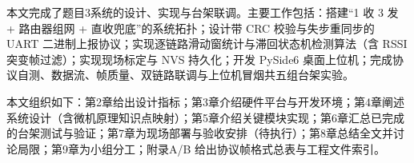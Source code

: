 本文完成了题目3系统的设计、实现与台架联调。主要工作包括：搭建“1 收 3 发 + 路由器组网 + 直收兜底”的系统拓扑；设计带 CRC 校验与失步重同步的 UART 二进制上报协议；实现逐链路滑动窗统计与滞回状态机检测算法（含 RSSI 突变帧过滤）；实现现场标定与 NVS 持久化；开发 PySide6 桌面上位机；完成协议自测、数据流、帧质量、双链路联调与上位机冒烟共五组台架实验。

本文组织如下：第2章给出设计指标；第3章介绍硬件平台与开发环境；第4章阐述系统设计（含微机原理知识点映射）；第5章介绍关键模块实现；第6章汇总已完成的台架测试与验证；第7章为现场部署与验收安排（待执行）；第8章总结全文并讨论局限；第9章为小组分工；附录A/B 给出协议帧格式总表与工程文件索引。
